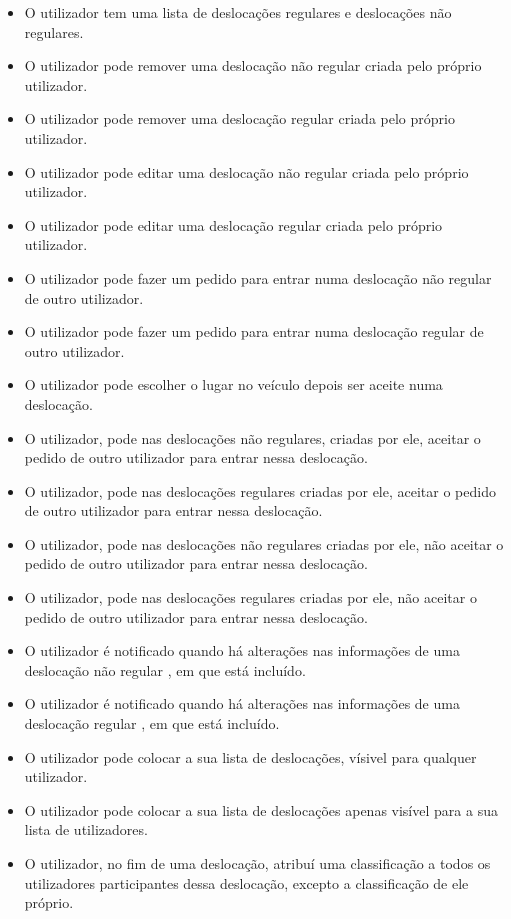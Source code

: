 \begin{itemize}
    \item O utilizador tem uma lista de deslocações regulares e deslocações não regulares.
    \item O utilizador pode remover uma deslocação não regular criada pelo próprio utilizador.
    \item O utilizador pode remover uma deslocação regular criada pelo próprio utilizador.
    \item O utilizador pode editar uma deslocação não regular criada pelo próprio utilizador.
    \item O utilizador pode editar uma deslocação regular criada pelo próprio utilizador.
    
    \item O utilizador pode fazer um pedido para entrar  numa deslocação não regular de outro utilizador.
    \item O utilizador pode fazer um pedido para entrar  numa deslocação regular de outro utilizador.
    \item O utilizador pode escolher o lugar no veículo depois ser aceite numa deslocação.
    \item O utilizador, pode nas deslocações não regulares, criadas por ele, aceitar o pedido de outro utilizador para entrar nessa deslocação.
    \item O utilizador, pode nas deslocações regulares criadas por ele, aceitar o pedido de outro utilizador para entrar nessa deslocação.
    \item O utilizador, pode nas deslocações não regulares criadas por ele, não aceitar o pedido de outro utilizador para entrar nessa deslocação.
    \item O utilizador, pode nas deslocações regulares criadas por ele, não aceitar o pedido de outro utilizador para entrar nessa deslocação.
    \item O utilizador é notificado quando há alterações nas informações de uma deslocação não regular , em que está incluído. 
    \item O utilizador é notificado quando há alterações nas informações de uma deslocação regular , em que está incluído.
    \item O utilizador pode colocar a sua lista de deslocações, vísivel para qualquer utilizador.
    \item O utilizador pode colocar a sua lista de deslocações apenas visível para a sua lista de utilizadores.
    \item O utilizador, no fim de uma deslocação, atribuí uma classificação a todos os utilizadores participantes dessa deslocação, excepto a classificação  de ele próprio.

\end{itemize}
